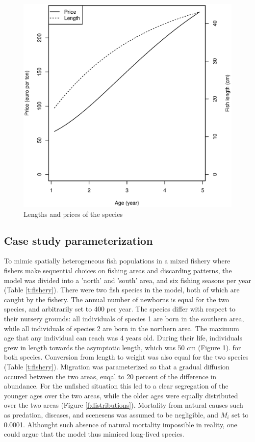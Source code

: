 \documentclass[12pt,oneline,a4paper,numbib]{ouparticle}
\numberwithin{equation}{subsection} %
\begin{document}
\begin{figure}[!ht]
\centering
\label{f:prices}
\includegraphics[width=.69\textwidth]{Figures/prices.eps} 
\caption{Lengths and prices of the species}
\end{figure}


\subsection{Case study parameterization}

To mimic spatially heterogeneous fish populations in a mixed fishery where fishers make sequential choices on fishing areas and discarding patterns, the model was divided into a 'north' and 'south' area, and six fishing seasons per year (Table \ref{t:fishery}). There were two fish species in the model, both of which are caught by the fishery. The annual number of newborns is equal for the two species, and arbitrarily set to 400 per year. The species differ with respect to their nursery grounds: all individuals of species 1 are born in the southern area, while all individuals of species 2 are born in the northern area. The maximum age that any individual can reach was 4 years old. During their life, individuals grew in length towards the asymptotic length, which was 50 cm (Figure \ref{f:prices}). for both species. Conversion from length to weight was also equal for the two species (Table \ref{t:fishery}). Migration was parameterized so that a gradual diffusion occured between the two areas, euqal to 20 percent of the difference in abundance. For the unfished situation this led to a clear segregation of the younger ages over the two areas, while the older ages were equally distributed over the two areas  (Figure \ref{f:distributions}). Mortality from natural causes such as predation, diseases, and scenesens was assumed to be negligible, and $M_i$ set to 0.0001. Althought such absence of natural mortality impossible in reality, one could argue that the model thus mimiced long-lived species.
  
\end{document}
